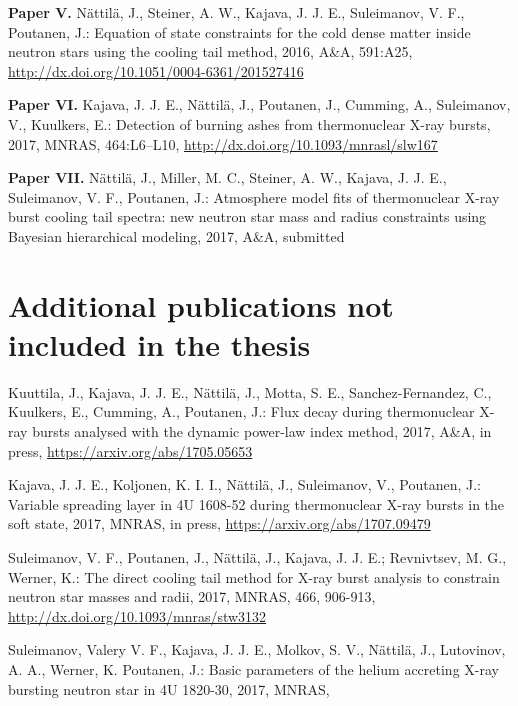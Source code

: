 \hspace{15pt}\textbf{Paper V.} Nättilä, J., Steiner, A. W., Kajava, J. J. E., Suleimanov, V. F., Poutanen, J.: Equation of state constraints for the cold dense matter inside neutron stars using the cooling tail method, 2016, A\&A, 591:A25, \url{http://dx.doi.org/10.1051/0004-6361/201527416}
 
\vspace{0.3cm}
\textbf{Paper VI.} Kajava, J. J. E., Nättilä, J., Poutanen, J., Cumming, A., Suleimanov, V., Kuulkers, E.: Detection of burning ashes from thermonuclear X-ray bursts, 2017, MNRAS, 464:L6–L10, \url{http://dx.doi.org/10.1093/mnrasl/slw167}

\vspace{0.3cm}
\textbf{Paper VII.} Nättilä, J., Miller, M. C., Steiner, A. W., Kajava, J. J. E., Suleimanov, V. F., Poutanen, J.: Atmosphere model fits of thermonuclear X-ray burst cooling tail spectra: new neutron star mass and radius constraints using Bayesian hierarchical modeling, 2017, A\&A, submitted




\newpage
\section*{Additional publications not included in the thesis}

\vspace{0.3cm}
\hspace{15pt} Kuuttila, J., Kajava, J. J. E., Nättilä, J., Motta, S. E., Sanchez-Fernandez, C., Kuulkers, E., Cumming, A., Poutanen, J.: Flux decay during thermonuclear X-ray bursts analysed with the dynamic power-law index method, 2017, A\&A, in press, \url{https://arxiv.org/abs/1705.05653}
 

\vspace{0.3cm}
 Kajava, J. J. E., Koljonen, K. I. I., Nättilä, J., Suleimanov, V., Poutanen, J.: Variable spreading layer in 4U 1608-52 during thermonuclear X-ray bursts in the soft state, 2017, MNRAS, in press, \url{https://arxiv.org/abs/1707.09479}


\vspace{0.3cm}
 Suleimanov, V. F., Poutanen, J., Nättilä, J., Kajava, J. J. E.; Revnivtsev, M. G., Werner, K.: The direct cooling tail method for X-ray burst analysis to constrain neutron star masses and radii, 2017, MNRAS, 466, 906-913, \url{http://dx.doi.org/10.1093/mnras/stw3132}
 

\vspace{0.3cm}
 Suleimanov, Valery V. F., Kajava, J. J. E., Molkov, S. V., Nättilä, J., Lutovinov, A. A., Werner, K. Poutanen, J.: Basic parameters of the helium accreting X-ray bursting neutron star in 4U 1820-30, 2017, MNRAS, 


